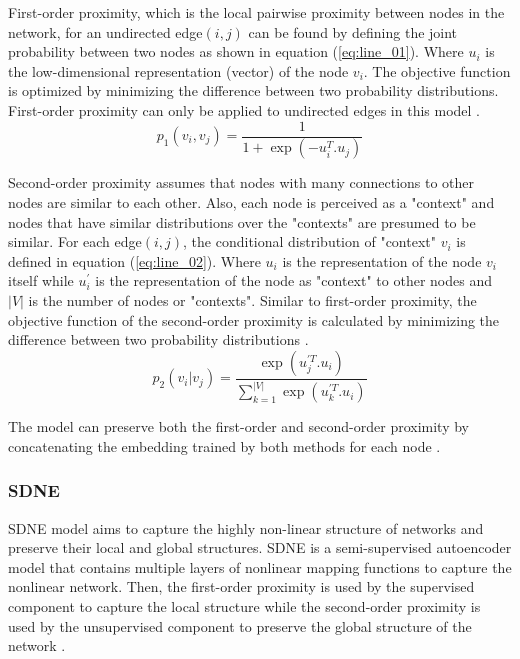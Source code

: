 First-order proximity, which is the local pairwise proximity between nodes in the network, for an undirected edge$(i,j)$ can be found by defining the joint probability between two nodes as shown in equation (\ref{eq:line_01}). Where $u_{i}$ is the low-dimensional representation (vector) of the node $v_{i}$. The objective function is optimized by minimizing the difference between two probability distributions. First-order proximity can only be applied to undirected edges in this model \cite{tang_line:_2015}.
\begin{equation} \label{eq:line_01}
p_{1}(v_{i}, v_{j}) = \frac{1}{1+ \exp{(-u_{i}^T .u_{j})}}
\end{equation}

Second-order proximity assumes that nodes with many connections to other nodes are similar to each other. Also, each node is perceived as a "context" and nodes that have similar distributions over the "contexts" are presumed to be similar. For each edge$(i,j)$, the conditional distribution of "context" $v_{i}$ is defined in equation (\ref{eq:line_02}). Where $u_{i}$ is the representation of the node $v_{i}$ itself while $u_{i}^{'}$ is the representation of the node as "context" to other nodes and $|V|$ is the number of nodes or "contexts". Similar to first-order proximity, the objective function of the second-order proximity is calculated by minimizing the difference between two probability distributions \cite{tang_line:_2015}.
\begin{equation} \label{eq:line_02}
p_{2}(v_{i}| v_{j}) = \frac{\exp(u_{j}^{'T} .u_{i})}{\sum_{k=1}^{|V|} \exp{(u_{k}^{'T} .u_{i})}}
\end{equation}

The model can preserve both the first-order and second-order proximity by concatenating the embedding trained by both methods for each node \cite{tang_line:_2015}.

\subsubsection{SDNE}
\label{subsection:SDNE}
\ac{SDNE} model aims to capture the highly non-linear structure of networks and preserve their local and global structures. \ac{SDNE} is a semi-supervised autoencoder model that contains multiple layers of nonlinear mapping functions to capture the nonlinear network. Then, the first-order proximity is used by the supervised component to capture the local structure while the second-order proximity is used by the unsupervised component to preserve the global structure of the network \cite{wang_structural_2016}. 

